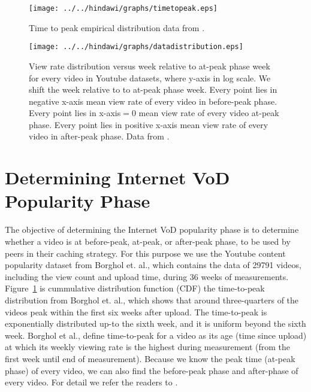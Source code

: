 
\begin{figure}[!t]
\begin{center}
\texttt{[image: ../../hindawi/graphs/timetopeak.eps]}
\end{center}
\caption{Time to peak empirical distribution data from \cite{Borghol:2011:CMP:2039452.2039717}.}
\label{fig:timetopeak}
\end{figure} 

\begin{figure}[!t]
\begin{center}
\texttt{[image: ../../hindawi/graphs/datadistribution.eps]}
\end{center}
\caption{View rate distribution versus week relative to at-peak phase week for every video in Youtube datasets, where y-axis in log scale.
We shift the week relative to to at-peak phase week.
Every point lies in negative x-axis mean view rate of every video in before-peak phase.
Every point lies in x-axis$=0$ mean view rate of every video at-peak phase. 
Every point lies in positive x-axis mean view rate of every video in after-peak phase.
Data from \cite{Borghol:2011:CMP:2039452.2039717}.
}
\label{fig:viewratedistribution}
\end{figure} 


\section{Determining Internet VoD Popularity Phase}\label{popularity}

The objective of determining the Internet VoD popularity phase is to determine whether a video is at before-peak, at-peak, or after-peak phase, to be used by peers in their caching strategy.
For this purpose we use the Youtube content popularity dataset from Borghol et. al.,\cite{Borghol:2011:CMP:2039452.2039717}  which contains the data of 29791 videos, including the view count and upload time, during 36 weeks of measurements.
Figure~\ref{fig:timetopeak} is cummulative distribution function (CDF) the time-to-peak distribution from Borghol et. al.,\cite{Borghol:2011:CMP:2039452.2039717}  which shows that around three-quarters of the videos peak within the first six weeks after upload.
The time-to-peak is exponentially distributed up-to the sixth week, and it is uniform beyond the sixth week.
Borghol et al., \cite{Borghol:2011:CMP:2039452.2039717} define time-to-peak for a video as its age (time since upload) at which its weekly viewing rate is the highest during measurement (from the first week until end of measurement).
Because we know the peak time (at-peak phase) of every video, we can also find the before-peak phase and after-phase of every video. 
For detail we refer the readers to \cite{Borghol:2011:CMP:2039452.2039717}.

